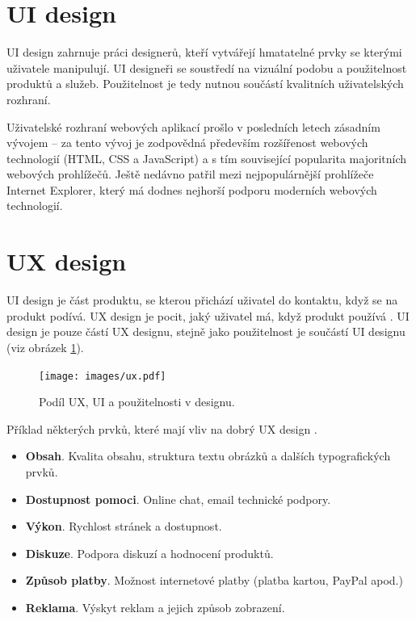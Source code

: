 \section{UI design}
\label{sec:uidesign}

UI design zahrnuje práci designerů, kteří vytvářejí hmatatelné prvky se kterými uživatele manipulují. UI designeři se soustředí na vizuální podobu a použitelnost produktů a služeb. Použitelnost je tedy nutnou součástí kvalitních uživatelských rozhraní.

Uživatelské rozhraní webových aplikací prošlo v posledních letech zásadním vývojem -- za tento vývoj je zodpovědná především rozšířenost webových technologií (HTML, CSS a JavaScript) a s tím související popularita majoritních webových prohlížečů. Ještě nedávno patřil mezi nejpopulárnější prohlížeče Internet Explorer, který má dodnes nejhorší podporu moderních webových technologií.

\section{UX design}
\label{sec:uxdesign}

UI design je část produktu, se kterou přichází uživatel do kontaktu, když se na produkt podívá. UX design je pocit, jaký uživatel má, když produkt používá \cite{ui-vs-ux}. UI design je pouze částí UX designu, stejně jako použitelnost je součástí UI designu (viz obrázek \ref{fig:ux-ui-usability}).

\begin{figure}[htbp]
    \centering
    \texttt{[image: images/ux.pdf]}
    \caption{Podíl UX, UI a použitelnosti v designu.}
    \label{fig:ux-ui-usability}
\end{figure}

Příklad některých prvků, které mají vliv na dobrý UX design \cite{understanding-ux-ui}.

\begin{itemize}
    \item \textbf{Obsah}. Kvalita obsahu, struktura textu obrázků a dalších typografických prvků.
    \item \textbf{Dostupnost pomoci}. Online chat, email technické podpory.
    \item \textbf{Výkon}. Rychlost stránek a dostupnost.
    \item \textbf{Diskuze}. Podpora diskuzí a hodnocení produktů.
    \item \textbf{Způsob platby}. Možnost internetové platby (platba kartou, PayPal apod.)
    \item \textbf{Reklama}. Výskyt reklam a jejich způsob zobrazení.
\end{itemize}

